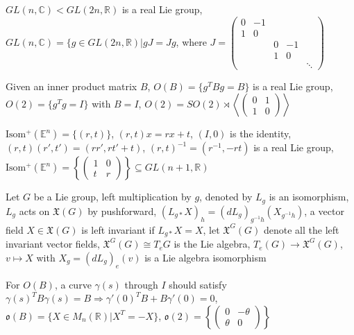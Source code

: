 \documentclass[../main.tex]{subfiles}
\begin{document}
\begin{example}
$GL(n,\mathbb C)< GL(2n,\mathbb R)$ is a real Lie group, $GL(n,\mathbb C)=\{g\in GL(2n,\mathbb R)|gJ=Jg$, where $J=\begin{pmatrix}
0&-1 \\
1&0 \\
&&0&-1 \\
&&1&0 \\
&&&&\ddots
\end{pmatrix}$
\end{example}

\begin{example}
Given an inner product matrix $B$, $O(B)=\{g^TBg=B\}$ is a real Lie group, $O(2)=\{g^Tg=I\}$ with $B=I$, $O(2)=SO(2)\rtimes\left\langle\begin{pmatrix}
0&1\\
1&0
\end{pmatrix}\right\rangle$
\end{example}

\begin{example}
$\mathrm{Isom^+}(\mathbb E^n)=\{(r,t)\}$, $(r,t)x=rx+t$, $(I,0)$ is the identity, $(r,t)(r',t')=(rr',rt'+t)$, $(r,t)^{-1}=(r^{-1},-rt)$ is a real Lie group, $\mathrm{Isom^+}(\mathbb E^n)=\left\{\begin{pmatrix}
1&0 \\
t&r
\end{pmatrix}\right\}\subseteq GL(n+1,\mathbb R)$
\end{example}

\begin{definition}
Let $G$ be a Lie group, left multiplication by $g$, denoted by $L_g$ is an isomorphism, $L_g$ acts on $\mathfrak{X}(G)$ by pushforward, $(L_{g*}X)_h=(dL_g)_{g^{-1}h}(X_{g^{-1}h})$, a vector field $X\in\mathfrak{X}(G)$ is left invariant if $L_{g*}X=X$, let $\mathfrak{X}^G(G)$ denote all the left invariant vector fields, $\mathfrak{X}^G(G)\cong T_eG$ is the Lie algebra, $T_e(G)\to \mathfrak{X}^G(G)$, $v\mapsto X$ with $X_g=(dL_g)_e(v)$ is a Lie algebra isomorphism
\end{definition}

\begin{example}
For $O(B)$, a curve $\gamma(s)$ through $I$ should satisfy $\gamma(s)^TB\gamma(s)=B\Rightarrow \gamma'(0)^TB+B\gamma'(0)=0$, $\mathfrak{o}(B)=\{X\in M_n(\mathbb R)|X^T=-X\}$, $\mathfrak{o}(2)=\left\{\begin{pmatrix}
0 & -\theta \\
\theta &0
\end{pmatrix}\right\}$
\end{example}
\end{document}
